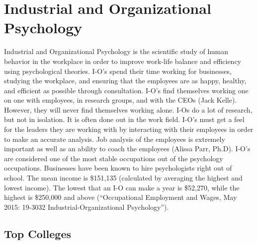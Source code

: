 \chapter{Industrial and Organizational Psychology}
\begin{multicols}{2}

Industrial and Organizational Psychology is the scientific study of human behavior in the workplace in order to improve work-life balance and efficiency using psychological theories. I-O’s spend their time working for businesses, studying the workplace, and ensuring that the employees are as happy, healthy, and efficient as possible through consultation. I-O’s find themselves working one on one with employees, in research groups, and with the CEOs (Jack Kelle). However, they will never find themselves working alone. I-Os do a lot of research, but not in isolation. It is often done out in the work field. I-O’s must get a feel for the leaders they are working with by interacting with their employees in order to make an accurate analysis. Job analysis of the employees is extremely important as well as an ability to coach the employees (Alissa Parr, Ph.D). I-O’s are considered one of the most stable occupations out of the psychology occupations. Businesses have been known to hire psychologists right out of school. The mean income is \$151,135 (calculated by averaging the highest and lowest income). The lowest that an I-O can make a year is \$52,270, while the highest is \$250,000 and above (“Occupational Employment and Wages, May 2015: 19-3032 Industrial-Organizational Psychology”). 

\end{multicols}

\section{Top Colleges}

